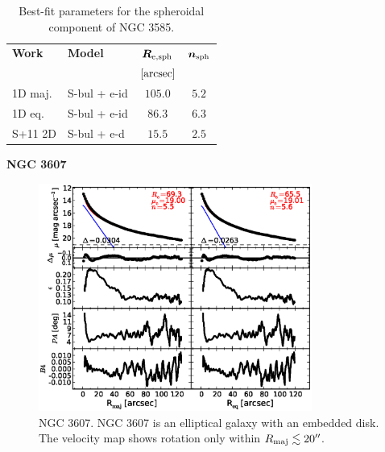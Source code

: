 \documentclass[preprint2]{emulateapj}
\newcommand{\fitfigurewidth}{0.8\textwidth}
\begin{document}
  \begin{table}[h]
  \small
  \caption{Best-fit parameters for the spheroidal component of NGC 3585.}
  \begin{center}
  \begin{tabular}{llcc}
  \hline
  {\bf Work} & {\bf Model}   & $\bm R_{\rm e,sph}$    & $\bm n_{\rm sph}$ \\
    &  &  $[\rm arcsec]$ & \\
  \hline
  1D maj. & S-bul + e-id & $105.0$  &  $5.2$ \\
  1D eq.  & S-bul + e-id & $86.3$  &  $6.3$ \\
  \hline
  S+11 2D         & S-bul + e-d      & $15.5$   &  $2.5$ \\
  \hline
  \end{tabular}
  \end{center}
  \label{tab:n3585}
  \end{table}


  \clearpage\newpage\noindent

  {\bf NGC 3607 \\}

  \begin{figure}[h]
  \begin{center}
  \includegraphics[width=\fitfigurewidth]{images/n3607_1Dfit.eps}
  \caption{NGC 3607. 
  NGC 3607 is an elliptical galaxy with an embedded disk. 
  The velocity map shows rotation only within $R_{\rm maj} \lesssim 20''$. 
   }
  \end{center}
  \end{figure}
  
\end{document}
